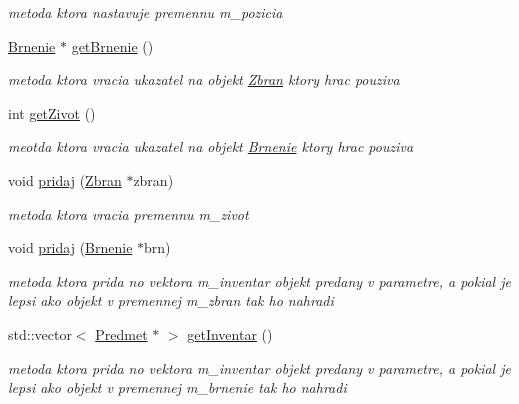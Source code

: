 \begin{DoxyCompactItemize}
\begin{DoxyCompactList}\small\item\em metoda ktora nastavuje premennu m\-\_\-pozicia \end{DoxyCompactList}\item 
\hypertarget{class_hrac_a69d7cd6bc722e35604d3c8d60be001f7}{\hyperlink{class_brnenie}{Brnenie} $\ast$ \hyperlink{class_hrac_a69d7cd6bc722e35604d3c8d60be001f7}{get\-Brnenie} ()}\label{class_hrac_a69d7cd6bc722e35604d3c8d60be001f7}

\begin{DoxyCompactList}\small\item\em metoda ktora vracia ukazatel na objekt \hyperlink{class_zbran}{Zbran} ktory hrac pouziva \end{DoxyCompactList}\item 
\hypertarget{class_hrac_a08592e19c7078a31e2f8edbd55ffb58f}{int \hyperlink{class_hrac_a08592e19c7078a31e2f8edbd55ffb58f}{get\-Zivot} ()}\label{class_hrac_a08592e19c7078a31e2f8edbd55ffb58f}

\begin{DoxyCompactList}\small\item\em meotda ktora vracia ukazatel na objekt \hyperlink{class_brnenie}{Brnenie} ktory hrac pouziva \end{DoxyCompactList}\item 
\hypertarget{class_hrac_ad36a26d588dc0c95435ab20304e62dda}{void \hyperlink{class_hrac_ad36a26d588dc0c95435ab20304e62dda}{pridaj} (\hyperlink{class_zbran}{Zbran} $\ast$zbran)}\label{class_hrac_ad36a26d588dc0c95435ab20304e62dda}

\begin{DoxyCompactList}\small\item\em metoda ktora vracia premennu m\-\_\-zivot \end{DoxyCompactList}\item 
\hypertarget{class_hrac_a349a8dd0bc3c75df4f3389f7c2fb8021}{void \hyperlink{class_hrac_a349a8dd0bc3c75df4f3389f7c2fb8021}{pridaj} (\hyperlink{class_brnenie}{Brnenie} $\ast$brn)}\label{class_hrac_a349a8dd0bc3c75df4f3389f7c2fb8021}

\begin{DoxyCompactList}\small\item\em metoda ktora prida no vektora m\-\_\-inventar objekt predany v parametre, a pokial je lepsi ako objekt v premennej m\-\_\-zbran tak ho nahradi \end{DoxyCompactList}\item 
\hypertarget{class_hrac_a191eb129196e1ffc5b191da6a0d78950}{std\-::vector$<$ \hyperlink{class_predmet}{Predmet} $\ast$ $>$ \hyperlink{class_hrac_a191eb129196e1ffc5b191da6a0d78950}{get\-Inventar} ()}\label{class_hrac_a191eb129196e1ffc5b191da6a0d78950}

\begin{DoxyCompactList}\small\item\em metoda ktora prida no vektora m\-\_\-inventar objekt predany v parametre, a pokial je lepsi ako objekt v premennej m\-\_\-brnenie tak ho nahradi \end{DoxyCompactList}\end{DoxyCompactItemize}


